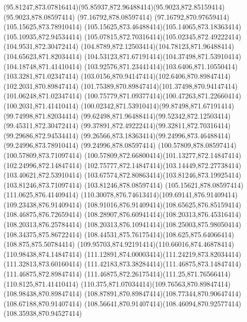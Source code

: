 {{	\curveto(95.81247,873.07816414)(95.85937,872.96488414)(95.9023,872.85159414)
	\lineto(95.9023,878.08597414)
	\lineto(97.16792,878.08597414)
	\lineto(97.16792,870.97659414)
	\closepath
	\moveto(105.15625,873.78910414)
	\curveto(105.15625,873.46488414)(105.14065,873.18363414)(105.10935,872.94534414)
	\curveto(105.07815,872.70316414)(105.02345,872.49222414)(104.9531,872.30472414)
	\curveto(104.8789,872.12503414)(104.78123,871.96488414)(104.65623,871.82034414)
	\curveto(104.53123,871.67191414)(104.37498,871.53910414)(104.18748,871.41410414)
	\curveto(103.92576,871.23441414)(103.6406,871.10550414)(103.3281,871.02347414)
	\curveto(103.0156,870.94147414)(102.6406,870.89847414)(102.2031,870.89847414)
	\curveto(101.75389,870.89847414)(101.37498,870.94147414)(101.06248,871.02347414)
	\curveto(100.75779,871.09377414)(100.47263,871.22660414)(100.2031,871.41410414)
	\curveto(100.02342,871.53910414)(99.87498,871.67191414)(99.74998,871.82034414)
	\curveto(99.62498,871.96488414)(99.52342,872.12503414)(99.45311,872.30472414)
	\curveto(99.37891,872.49222414)(99.32811,872.70316414)(99.29686,872.94534414)
	\curveto(99.26566,873.18363414)(99.24996,873.46488414)(99.24996,873.78910414)
	\lineto(99.24996,878.08597414)
	\lineto(100.57809,878.08597414)
	\lineto(100.57809,873.71097414)
	\curveto(100.57809,872.66800414)(101.13277,872.14847414)(102.24996,872.14847414)
	\curveto(102.75777,872.14847414)(103.14449,872.27738414)(103.40621,872.53910414)
	\curveto(103.67574,872.80863414)(103.81246,873.19925414)(103.81246,873.71097414)
	\lineto(103.81246,878.08597414)
	\lineto(105.15621,878.08597414)
	\closepath
	\moveto(111.0625,876.41409414)
	\curveto(110.30078,876.74613414)(109.69141,876.91409414)(109.23438,876.91409414)
	\curveto(108.91016,876.91409414)(108.65625,876.85159414)(108.46875,876.72659414)
	\curveto(108.28907,876.60941414)(108.20313,876.45316414)(108.20313,876.25784414)
	\curveto(108.20313,876.10941414)(108.25003,875.98050414)(108.34375,875.86722414)
	\curveto(108.44531,875.76175414)(108.625,875.64066414)(108.875,875.50784414)
	\curveto(109.95703,874.92191414)(110.66016,874.46878414)(110.98438,874.14847414)
	\curveto(111.12891,874.00003414)(111.24219,873.82034414)(111.32813,873.60160414)
	\curveto(111.42183,873.38284414)(111.46875,873.14847414)(111.46875,872.89847414)
	\curveto(111.46875,872.26175414)(111.25,871.76566414)(110.8125,871.41410414)
	\curveto(110.375,871.07034414)(109.76563,870.89847414)(108.98438,870.89847414)
	\curveto(108.87891,870.89847414)(108.77344,870.90647414)(108.67188,870.91407414)
	\curveto(108.56641,870.91407414)(108.46094,870.92577414)(108.35938,870.94527414)
}}

